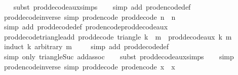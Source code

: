 \begin{isabellebody}
\ \ \isamarkupfalse%
\ {\isacharparenleft}subst\ prod{\isacharunderscore}decode{\isacharunderscore}aux{\isachardot}simps{\isacharparenright}\isanewline
\ \ \isamarkupfalse%
\ {\isacharparenleft}simp\ add{\isacharcolon}\ prod{\isacharunderscore}encode{\isacharunderscore}def{\isacharparenright}\isanewline
\ \ \isamarkupfalse%
%
\endisatagproof
{\isafoldproof}%
%
\isadelimproof
\isanewline
%
\endisadelimproof
\isanewline
{}\isamarkupfalse%
\ prod{\isacharunderscore}decode{\isacharunderscore}inverse\ {\isacharbrackleft}simp{\isacharbrackright}{\isacharcolon}\ {\isachardoublequoteopen}prod{\isacharunderscore}encode\ {\isacharparenleft}prod{\isacharunderscore}decode\ n{\isacharparenright}\ {\isacharequal}\ n{\isachardoublequoteclose}\isanewline
%
\isadelimproof
\ \ %
\endisadelimproof
%
\isatagproof
{}\isamarkupfalse%
\ {\isacharparenleft}simp\ add{\isacharcolon}\ prod{\isacharunderscore}decode{\isacharunderscore}def\ prod{\isacharunderscore}encode{\isacharunderscore}prod{\isacharunderscore}decode{\isacharunderscore}aux{\isacharparenright}%
\endisatagproof
{\isafoldproof}%
%
\isadelimproof
\isanewline
%
\endisadelimproof
\isanewline
{}\isamarkupfalse%
\ prod{\isacharunderscore}decode{\isacharunderscore}triangle{\isacharunderscore}add{\isacharcolon}\ {\isachardoublequoteopen}prod{\isacharunderscore}decode\ {\isacharparenleft}triangle\ k\ {\isacharplus}\ m{\isacharparenright}\ {\isacharequal}\ prod{\isacharunderscore}decode{\isacharunderscore}aux\ k\ m{\isachardoublequoteclose}\isanewline
%
\isadelimproof
\ \ %
\endisadelimproof
%
\isatagproof
{}\isamarkupfalse%
\ {\isacharparenleft}induct\ k\ arbitrary{\isacharcolon}\ m{\isacharparenright}\isanewline
\ \ \ \isamarkupfalse%
\ {\isacharparenleft}simp\ add{\isacharcolon}\ prod{\isacharunderscore}decode{\isacharunderscore}def{\isacharparenright}\isanewline
\ \ \isamarkupfalse%
\ {\isacharparenleft}simp\ only{\isacharcolon}\ triangle{\isacharunderscore}Suc\ add{\isachardot}assoc{\isacharparenright}\isanewline
\ \ \isamarkupfalse%
\ {\isacharparenleft}subst\ prod{\isacharunderscore}decode{\isacharunderscore}aux{\isachardot}simps{\isacharparenright}\isanewline
\ \ \isamarkupfalse%
\ simp\isanewline
\ \ \isamarkupfalse%
%
\endisatagproof
{\isafoldproof}%
%
\isadelimproof
\isanewline
%
\endisadelimproof
\isanewline
{}\isamarkupfalse%
\ prod{\isacharunderscore}encode{\isacharunderscore}inverse\ {\isacharbrackleft}simp{\isacharbrackright}{\isacharcolon}\ {\isachardoublequoteopen}prod{\isacharunderscore}decode\ {\isacharparenleft}prod{\isacharunderscore}encode\ x{\isacharparenright}\ {\isacharequal}\ x{\isachardoublequoteclose}\isanewline

\end{isabellebody}
